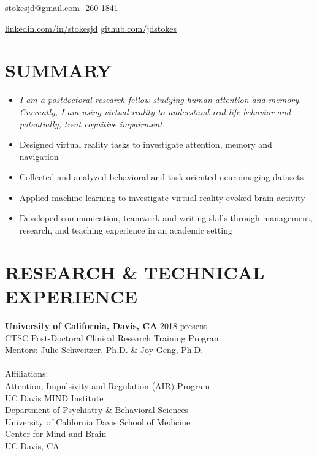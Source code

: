 \documentclass[line,margin,10pt]{res}
\begin{document}

\begin{resume}
\hoffset\centerline 
{\hyperref[stokesjd@gmail.com]{stokesjd@gmail.com} \quad \quad \quad \quad  \quad \quad \quad \quad \quad \quad \quad \quad \quad \quad \quad \quad \quad \quad \quad \quad\quad \quad \quad \quad \quad \quad \quad \quad \quad \quad \quad  \quad \quad \quad \quad {}-260-1841}
\hoffset\centerline 
{\hspace{0.00cm} \hyperref[linkedin.com/in/stokesjd]{linkedin.com/in/stokesjd} \quad \quad \quad \quad \quad \quad \quad \quad \quad \quad \quad\quad \quad \quad \quad  \quad \quad \quad \quad \quad \quad \quad \quad \quad  \quad \quad \quad  \quad \quad \quad   \quad \hyperref[github.com/jdstokes]{github.com/jdstokes}}


\section{SUMMARY} 
\begin{itemize} \itemsep -2pt
\item  []{\sl I am a postdoctoral research fellow studying human attention and memory. Currently, I am using virtual reality to understand real-life behavior and potentially, treat cognitive impairment.}\\
\item Designed virtual reality tasks to investigate attention, memory and navigation
\item Collected and analyzed behavioral and task-oriented neuroimaging datasets
\item Applied machine learning to investigate virtual reality evoked brain activity
\item Developed communication, teamwork and writing skills through management, research, and teaching experience in an academic setting
\end{itemize}

\section{RESEARCH \& TECHNICAL EXPERIENCE} 


\textbf{University of California, Davis, CA } \hfill 2018-present \\
CTSC Post-Doctoral Clinical Research Training Program\\
Mentors: Julie Schweitzer, Ph.D. \& Joy Geng, Ph.D.\\
\\
Affiliations:\\
Attention, Impulsivity and Regulation (AIR) Program\\
UC Davis MIND Institute\\
Department of Psychiatry \& Behavioral Sciences\\
University of California Davis School of Medicine
\\
Center for Mind and Brain \\
UC Davis, CA\\


\end{resume}
\end{document}
